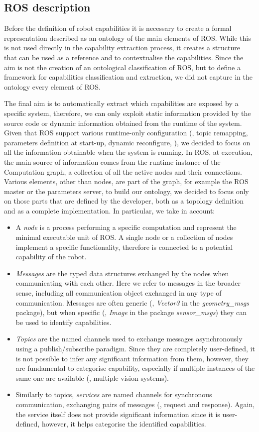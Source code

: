 \subsection{ROS description}
\label{sec:ros-desc}
Before the definition of robot capabilities it is necessary to create a formal representation described as an ontology of the main elements of ROS. While this is not used directly in the capability extraction process, it creates a structure that can be used as a reference and to contextualise the capabilities. Since the aim is not the creation of an ontological classification of ROS, but to define a framework for capabilities classification and extraction, we did not capture in the ontology every element of ROS. 

The final aim is to automatically extract which capabilities are exposed by a specific system, therefore, we can only exploit static information provided by the source code or dynamic information obtained from the runtime of the system. Given that ROS support various runtime-only configuration (\eg, topic remapping, parameters definition at start-up, dynamic reconfigure, \etc), we decided to focus on all the information obtainable when the system is running. In ROS, at execution, the main source of information comes from the runtime instance of the Computation graph, a collection of all the active nodes and their connections. Various elements, other than nodes, are part of the graph, for example the ROS master or the parameters server, to build our ontology, we decided to focus only on those parts that are defined by the developer, both as a topology definition and as a complete implementation. In particular, we take in account:
\begin{itemize}
\item A \textit{node} is a process performing a specific computation and represent the minimal executable unit of ROS. A single node or a collection of nodes implement a specific functionality, therefore is connected to a potential capability of the robot.
\item \textit{Messages} are the typed data structures exchanged by the nodes when communicating with each other. Here we refer to messages in the broader sense, including all communication object exchanged in any type of communication. Messages are often generic (\eg, \textit{Vector3} in the \textit{geometry\_msgs} package), but when specific (\eg, \textit{Image} in the package \textit{sensor\_msgs})  they can be used to identify capabilities.
\item \textit{Topics} are the named channels used to exchange messages asynchronously using a publish/subscribe paradigm. Since they are completely user-defined, it is not possible to infer any significant information from them, however, they are fundamental to categorise capability, especially if multiple instances of the same one are available (\eg, multiple vision systems).
\item Similarly to topics, \textit{services} are named channels for synchronous communication, exchanging pairs of messages (\ie, request and response). Again, the service itself does not provide significant information since it is user-defined, however, it helps categorise the identified capabilities.  
\end{itemize}
